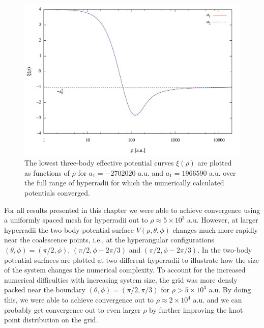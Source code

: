 \begin{figure}[h!]
	\includegraphics[width=\linewidth]{infty.pdf}
	\caption{The lowest three-body effective potential curves $\xi(\rho)$ are plotted as functions of $\rho$ for $a_1 = -2702020$ a.u. and $a_1 = 1966590$ a.u. over the full range of hyperradii for which the numerically calculated potentials converged.}
	\label{fig:infty}
\end{figure}

For all results presented in this chapter we were able to achieve convergence using a uniformly spaced mesh for hyperradii out to $\rho \approx 5 \times 10^3$ a.u. However, at larger hyperradii the two-body potential surface $V(\rho,\theta,\phi)$ changes much more rapidly near the coalescence points, i.e., at the hyperangular configurations $(\theta,\phi) = (\pi/2,\phi)$, $(\pi/2,\phi - 2\pi/3)$ and $(\pi/2,\phi - 2\pi/3)$. In  the two-body potential surfaces are plotted at two different hyperradii to illustrate how the size of the system changes the numerical complexity. To account for the increased numerical difficulties with increasing system size, the grid was more densly packed near the boundary $(\theta,\phi)=(\pi/2,\pi/3)$ for $\rho > 5 \times 10^3$ a.u. By doing this, we were able to achieve convergence out to $\rho \approx 2 \times 10^4$ a.u. and we can probably get convergence out to even larger $\rho$ by further improving the knot point distribution on the grid.

